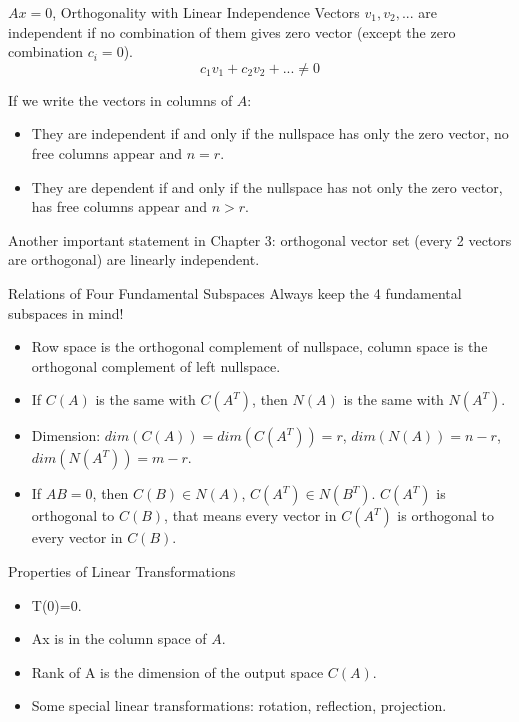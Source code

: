\documentclass{beamer}
\begin{document}
\begin{frame}{$Ax=0$, Orthogonality with Linear Independence}
Vectors $v_1, v_2, ...$ are independent if no combination of them gives zero vector (except the zero combination $c_i=0$).
\vspace{-8pt}
\begin{equation*}
    c_1v_1+c_2v_2+...\ne0
\end{equation*}

If we write the vectors in columns of $A$:
\begin{itemize}
    \item They are independent if and only if the nullspace has only the zero vector, no free columns appear and $n=r$.
    \item They are dependent if and only if the nullspace has not only the zero vector, has free columns appear and $n>r$.
\end{itemize}

Another important statement in Chapter 3: orthogonal vector set (every 2 vectors are orthogonal) are linearly independent.
\end{frame}

\begin{frame}{Relations of Four Fundamental Subspaces}
Always keep the 4 fundamental subspaces in mind!
\begin{itemize}
    \item Row space is the orthogonal complement of nullspace, column space is the orthogonal complement of left nullspace.
    \item If $C(A)$ is the same with $C(A^T)$, then  $N(A)$ is the same with $N(A^T)$.
    \item Dimension: $dim(C(A))=dim(C(A^T))=r$, $dim(N(A))=n-r$, $dim(N(A^T))=m-r$.
    \item If $AB=0$, then $C(B)\in N(A)$, $C(A^T)\in N(B^T)$. $C(A^T)$ is orthogonal to $C(B)$, that means every vector in $C(A^T)$ is orthogonal to every vector in $C(B)$.
\end{itemize}

\end{frame}

\begin{frame}{Properties of Linear Transformations}
\begin{itemize}
    \item T(0)=0.
    \item Ax is in the column space of $A$.
    \item Rank of A is the dimension of the output space $C(A)$.
    \item Some special linear transformations: rotation, reflection, projection.
\end{itemize}
\end{frame}
\end{document}
